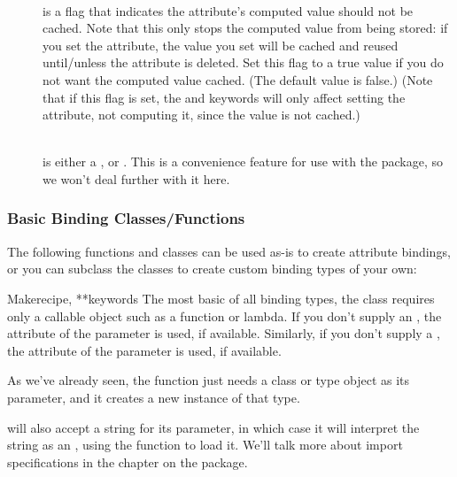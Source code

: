 \begin{verbatim%
}
\begin{verbatim%
}
\begin{verbatim%
}
\begin{verbatim%
}
\begin{verbatim%
}
\begin{verbatim%
}
\begin{verbatim%
}
\begin{verbatim%
}
\begin{verbatim%
}
\begin{description}
\item[] \hfill \\
 is a flag that indicates the attribute's computed value should
not be cached.  Note that this only stops the computed value from being
stored: if you set the attribute, the value you set will be cached and reused
until/unless the attribute is deleted.  Set this flag to a true value if you
do not want the computed value cached.  (The default value is false.)
(Note that if this flag is set, the  and 
keywords will only affect setting the attribute, not computing it, since the
value is not cached.)

\item[] \hfill \\
 is either a ,
or .  This is a convenience feature for use with the
 package, so we won't deal further with it here.

\end{description}








\subsubsection{Basic Binding Classes/Functions}

The following functions and classes can be used as-is to create attribute
bindings, or you can subclass the classes to create custom binding types
of your own:

\begin{funcdesc}{Make}{recipe, **keywords}
The most basic of all binding types, the  class requires
only a callable object such as a function or lambda.  If you don't supply an
, the  attribute of the  parameter is
used, if available.  Similarly, if you don't supply a , the
 attribute of the  parameter is used, if available.

As we've already seen, the  function just needs a class
or type object as its  parameter, and it creates a new instance of
that type.

 will also accept a string for its 
parameter, in which case it will interpret the string as an , using the  function to
load it.  We'll talk more about import specifications in the chapter on the
 package.
\end{funcdesc}


\end{verbatim%
}
\end{verbatim%
}
\end{verbatim%
}
\end{verbatim%
}
\end{verbatim%
}
\end{verbatim%
}
\end{verbatim%
}
\end{verbatim%
}
\end{verbatim%
}
